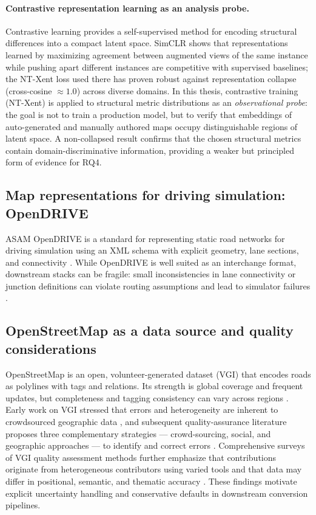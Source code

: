 \paragraph{Contrastive representation learning as an analysis probe.}
Contrastive learning provides a self-supervised method for encoding structural differences into a compact latent space.
SimCLR \citep{chen2020simclr} shows that representations learned by maximizing agreement between augmented views of the same instance while pushing apart different instances are competitive with supervised baselines; the NT-Xent loss used there has proven robust against representation collapse (cross-cosine $\approx 1.0$) across diverse domains.
In this thesis, contrastive training (NT-Xent) is applied to structural metric distributions as an \emph{observational probe}: the goal is not to train a production model, but to verify that embeddings of auto-generated and manually authored maps occupy distinguishable regions of latent space.
A non-collapsed result confirms that the chosen structural metrics contain domain-discriminative information, providing a weaker but principled form of evidence for RQ4.

\subsection{Map representations for driving simulation: OpenDRIVE}
ASAM OpenDRIVE is a standard for representing static road networks for driving simulation using an XML schema with explicit geometry, lane sections, and connectivity \cite{asam_opendrive_181}. While OpenDRIVE is well suited as an interchange format, downstream stacks can be fragile: small inconsistencies in lane connectivity or junction definitions can violate routing assumptions and lead to simulator failures \cite{carla_opendrive_standalone}.

\subsection{OpenStreetMap as a data source and quality considerations}
OpenStreetMap is an open, volunteer-generated dataset (VGI) that encodes roads as polylines with tags and relations. Its strength is global coverage and frequent updates, but completeness and tagging consistency can vary across regions \cite{haklay2010osm}.  Early work on VGI stressed that errors and heterogeneity are inherent to crowdsourced geographic data \cite{goodchild2007vgi}, and subsequent quality-assurance literature proposes three complementary strategies --- crowd-sourcing, social, and geographic approaches --- to identify and correct errors \cite{goodchild2012assuring}.  Comprehensive surveys of VGI quality assessment methods further emphasize that contributions originate from heterogeneous contributors using varied tools and that data may differ in positional, semantic, and thematic accuracy \cite{senaratne2017vgi}.  These findings motivate explicit uncertainty handling and conservative defaults in downstream conversion pipelines.

